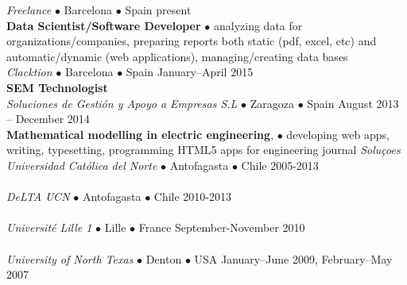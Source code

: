 \documentclass[a4paper, twoside]{scrreprt}
\begin{document}
\vspace{0.1cm}

\noindent{}\textit{Freelance} $\bullet$ 
Barcelona $\bullet$ Spain \hfill present\\
\noindent\textbf{\small Data Scientist/Software Developer} $\bullet$ 
{\small analyzing data for organizations/companies, preparing reports both static (pdf, 
excel, etc) and automatic/dynamic (web applications), 
managing/creating data bases}\\
\noindent{}\textit{Clacktion} $\bullet$ 
Barcelona $\bullet$ Spain \hfill January--April 2015\\
\noindent\textbf{\small SEM Technologist}\\ 
\noindent{}\textit{Soluciones de Gestión y Apoyo a Empresas S.L} 
$\bullet$ Zaragoza $\bullet$ Spain \hfill August 2013 -- December 2014\\
\noindent\textbf{\small Mathematical modelling in electric engineering}, $\bullet$ 
{\small developing web apps, writing, typesetting, programming HTML5 apps
for engineering journal \emph{Soluçoes}}\\
\noindent{}\textit{Universidad Católica del Norte} $\bullet$ 
Antofagasta $\bullet$ Chile \hfill 2005-2013\\
\\
\noindent{}\textit{DeLTA UCN} $\bullet$ 
Antofagasta $\bullet$ Chile \hfill 2010-2013\\
\\
\noindent{}\textit{Universit{\'e} Lille 1} $\bullet$ Lille $\bullet$ France \hfill September-November 2010\\
\\
\noindent{}\textit{University of North Texas} $\bullet$ Denton $\bullet$ USA \hfill January–June 2009, February–May 2007\\
\\
\end{document}

